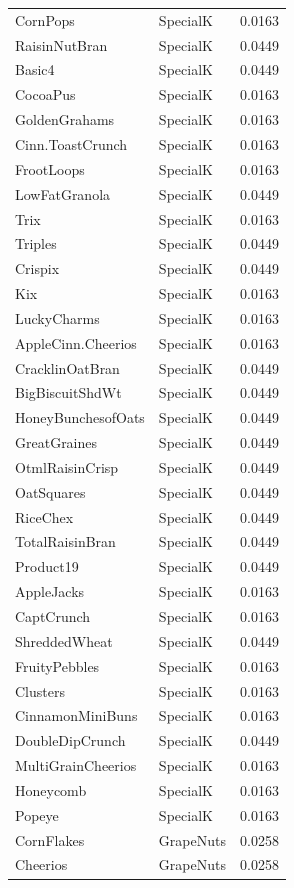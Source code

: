 \begin{longtable}{llr}
CornPops & SpecialK & 0.0163 \\
RaisinNutBran & SpecialK & 0.0449 \\
Basic4 & SpecialK & 0.0449 \\
CocoaPus & SpecialK & 0.0163 \\
GoldenGrahams & SpecialK & 0.0163 \\
Cinn.ToastCrunch & SpecialK & 0.0163 \\
FrootLoops & SpecialK & 0.0163 \\
LowFatGranola & SpecialK & 0.0449 \\
Trix & SpecialK & 0.0163 \\
Triples & SpecialK & 0.0449 \\
Crispix & SpecialK & 0.0449 \\
Kix & SpecialK & 0.0163 \\
LuckyCharms & SpecialK & 0.0163 \\
AppleCinn.Cheerios & SpecialK & 0.0163 \\
CracklinOatBran & SpecialK & 0.0449 \\
BigBiscuitShdWt & SpecialK & 0.0449 \\
HoneyBunchesofOats & SpecialK & 0.0449 \\
GreatGraines & SpecialK & 0.0449 \\
OtmlRaisinCrisp & SpecialK & 0.0449 \\
OatSquares & SpecialK & 0.0449 \\
RiceChex & SpecialK & 0.0449 \\
TotalRaisinBran & SpecialK & 0.0449 \\
Product19 & SpecialK & 0.0449 \\
AppleJacks & SpecialK & 0.0163 \\
CaptCrunch & SpecialK & 0.0163 \\
ShreddedWheat & SpecialK & 0.0449 \\
FruityPebbles & SpecialK & 0.0163 \\
Clusters & SpecialK & 0.0163 \\
CinnamonMiniBuns & SpecialK & 0.0163 \\
DoubleDipCrunch & SpecialK & 0.0449 \\
MultiGrainCheerios & SpecialK & 0.0163 \\
Honeycomb & SpecialK & 0.0163 \\
Popeye & SpecialK & 0.0163 \\
CornFlakes & GrapeNuts & 0.0258 \\
Cheerios & GrapeNuts & 0.0258 \\

\end{longtable}
